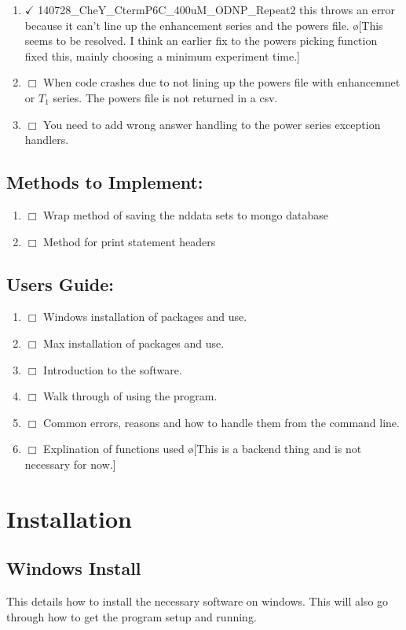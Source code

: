 \documentclass[10pt]{book}
\begin{document}
\begin{enumerate}
    \item $\checkmark$ 140728_CheY_CtermP6C_400uM_ODNP_Repeat2 this throws an error because it can't line up the enhancement series and the powers file. \o[This seems to be resolved. I think an earlier fix to the powers picking function fixed this, mainly choosing a minimum experiment time.]{}
    \item $\Box$ When code crashes due to not lining up the powers file with enhancemnet or $T_1$ series. The powers file is not returned in a csv.
    \item $\Box$ You need to add wrong answer handling to the power series exception handlers.
\end{enumerate}
\section{Methods to Implement:}
\begin{enumerate}
    \item $\Box$ Wrap method of saving the nddata sets to mongo database
    \item $\Box$ Method for print statement headers
\end{enumerate}
\section{Users Guide:}
\begin{enumerate}
    \item $\Box$ Windows installation of packages and use.
    \item $\Box$ Max installation of packages and use.
    \item $\Box$ Introduction to the software.
    \item $\Box$ Walk through of using the program.
    \item $\Box$ Common errors, reasons and how to handle them from the command line.
    \item $\Box$ Explination of functions used \o[This is a backend thing and is not necessary for now.]{}
\end{enumerate}
\chapter{Installation}
\section{Windows Install}
This details how to install the necessary software on windows. This will also go through how to get the program setup and running.
\end{document}
